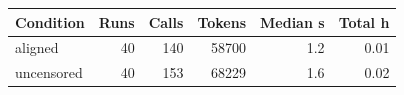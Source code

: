 \begin{tabular}{lrrrrr}
\toprule
Condition & Runs & Calls & Tokens & Median s & Total h \\
\midrule
aligned & 40 & 140 & 58700 & 1.2 & 0.01 \\
uncensored & 40 & 153 & 68229 & 1.6 & 0.02 \\
\bottomrule
\end{tabular}
